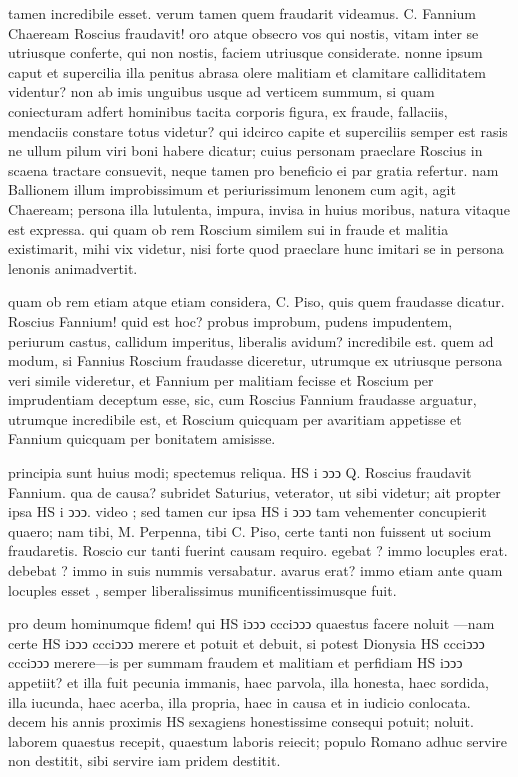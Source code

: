  tamen incredibile esset. verum tamen quem fraudarit videamus. C. Fannium Chaeream Roscius fraudavit! oro atque obsecro vos qui nostis, vitam inter se utriusque conferte, qui non nostis, faciem utriusque considerate. nonne ipsum caput et supercilia illa penitus abrasa olere malitiam et clamitare calliditatem videntur? non ab imis unguibus usque ad verticem summum, si quam coniecturam adfert hominibus tacita corporis figura, ex fraude, fallaciis, mendaciis constare totus videtur? qui idcirco capite et superciliis semper est rasis ne ullum pilum viri boni habere dicatur; cuius personam praeclare Roscius in scaena tractare consuevit, neque tamen pro beneficio ei par gratia refertur. nam Ballionem illum improbissimum et periurissimum lenonem cum agit, agit Chaeream; persona illa lutulenta, impura, invisa in huius moribus, natura vitaque est expressa. qui quam ob rem Roscium similem sui in fraude et malitia existimarit, mihi vix videtur, nisi forte quod praeclare hunc imitari se in persona lenonis animadvertit.

 quam ob rem etiam atque etiam considera, C. Piso, quis quem fraudasse dicatur. Roscius Fannium! quid est hoc? probus improbum, pudens impudentem, periurum castus, callidum imperitus, liberalis avidum? incredibile est. quem ad modum, si Fannius Roscium fraudasse diceretur, utrumque ex utriusque persona veri simile videretur, et Fannium per malitiam fecisse et Roscium per imprudentiam deceptum esse, sic, cum Roscius Fannium fraudasse arguatur, utrumque incredibile est, et Roscium quicquam per avaritiam appetisse et Fannium quicquam per bonitatem amisisse.

 principia sunt huius modi; spectemus reliqua. HS i ↄↄↄ Q. Roscius fraudavit Fannium. qua de causa? subridet Saturius, veterator, ut sibi videtur; ait propter ipsa HS i ↄↄↄ. video ; sed tamen cur ipsa HS i ↄↄↄ tam vehementer concupierit quaero; nam tibi, M. Perpenna, tibi C. Piso, certe tanti non fuissent ut socium fraudaretis. Roscio cur tanti fuerint causam requiro. egebat ? immo locuples erat. debebat ? immo in suis nummis versabatur. avarus erat? immo etiam ante quam locuples esset , semper liberalissimus munificentissimusque fuit.

 pro deum hominumque fidem! qui HS iↄↄↄ ccciↄↄↄ quaestus facere noluit —nam certe HS iↄↄↄ ccciↄↄↄ merere et potuit et debuit, si potest Dionysia HS ccciↄↄↄ ccciↄↄↄ merere—is per summam fraudem et malitiam et perfidiam HS iↄↄↄ appetiit? et illa fuit pecunia immanis, haec parvola, illa honesta, haec sordida, illa iucunda, haec acerba, illa propria, haec in causa et in iudicio conlocata. decem his annis proximis HS sexagiens honestissime consequi potuit; noluit. laborem quaestus recepit, quaestum laboris reiecit; populo Romano adhuc servire non destitit, sibi servire iam pridem destitit.


